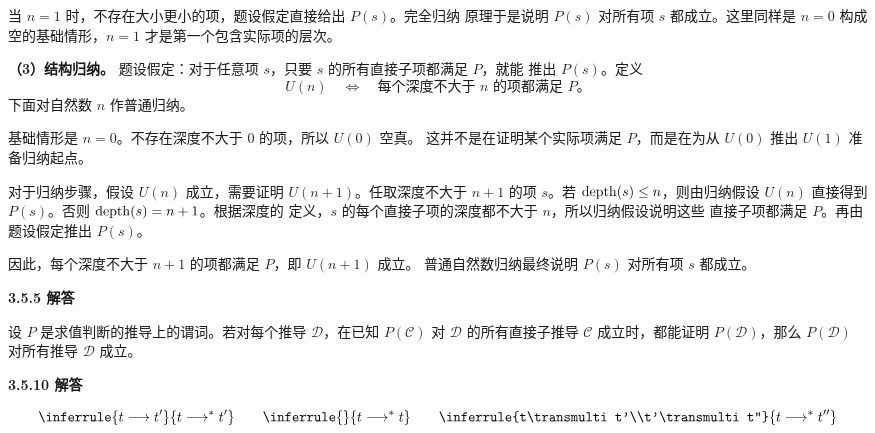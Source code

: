 {当 \(n=1\) 时，不存在大小更小的项，题设假定直接给出 \(P(s)\)。完全归纳
原理于是说明 \(P(s)\) 对所有项 \(s\) 都成立。这里同样是 \(n=0\) 构成
空的基础情形，\(n=1\) 才是第一个包含实际项的层次。

\medskip\noindent
\textbf{（3）结构归纳。}
题设假定：对于任意项 \(s\)，只要 \(s\) 的所有直接子项都满足 \(P\)，就能
推出 \(P(s)\)。定义
\[
  U(n)\quad\Longleftrightarrow\quad
  \text{每个深度不大于 \(n\) 的项都满足 \(P\)。}
\]
下面对自然数 \(n\) 作普通归纳。

基础情形是 \(n=0\)。不存在深度不大于 \(0\) 的项，所以 \(U(0)\) 空真。
这并不是在证明某个实际项满足 \(P\)，而是在为从 \(U(0)\) 推出 \(U(1)\)
准备归纳起点。

对于归纳步骤，假设 \(U(n)\) 成立，需要证明 \(U(n+1)\)。任取深度不大于
\(n+1\) 的项 \(s\)。若 \(\operatorname{depth}(s)\leq n\)，则由归纳假设
\(U(n)\) 直接得到 \(P(s)\)。否则 \(\operatorname{depth}(s)=n+1\)。根据深度的
定义，\(s\) 的每个直接子项的深度都不大于 \(n\)，所以归纳假设说明这些
直接子项都满足 \(P\)。再由题设假定推出 \(P(s)\)。

因此，每个深度不大于 \(n+1\) 的项都满足 \(P\)，即 \(U(n+1)\) 成立。
普通自然数归纳最终说明 \(P(s)\) 对所有项 \(s\) 都成立。}


\begin{taplauthorsolutionentrybox}
\label{sol:author:3.5.5}
\textbf{3.5.5 解答}

设 \(P\) 是求值判断的推导上的谓词。若对每个推导 \(\mathcal D\)，在已知
\(P(\mathcal C)\) 对 \(\mathcal D\) 的所有直接子推导
\(\mathcal C\) 成立时，都能证明 \(P(\mathcal D)\)，那么
\(P(\mathcal D)\) 对所有推导 \(\mathcal D\) 成立。

\end{taplauthorsolutionentrybox}

\begin{taplauthorsolutionentrybox}
\label{sol:author:3.5.10}
\textbf{3.5.10 解答}

\[
\inferrule{t\trans t'}{t\transmulti t'}
\qquad
\inferrule{ }{t\transmulti t}
\qquad
\inferrule{t\transmulti t'\\t'\transmulti t''}
          {t\transmulti t''}
\]

\end{taplauthorsolutionentrybox}

